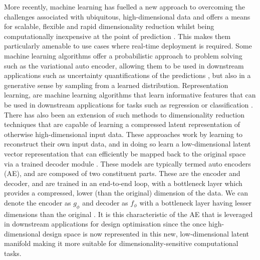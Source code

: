 \documentclass{article}
\begin{document}
More recently, machine learning has fuelled a new approach to overcoming the challenges associated with ubiquitous, high-dimensional data and offers a means for scalable, flexible and rapid dimensionality reduction whilst being computationally inexpensive at the point of prediction \citep{Deshpande2024}. This makes them particularly amenable to use cases where real-time deployment is required.  Some machine learning algorithms offer a probabilistic approach to problem solving such as the variational auto encoder, allowing them to be used in downstream applications such as uncertainty quantifications of the predictions \citep{Donnelly2024}, but also in a generative sense by sampling from a learned distribution. Representation learning,  are machine learning algorithms that learn informative features that can be used in downstream applications for tasks such as regression or classification \citep{Bengio2012}. There has also been an extension of such methods to dimensionality reduction techniques that are capable of learning a compressed latent representation of otherwise high-dimensional input data. These approaches work by learning to reconstruct their own input data, and in doing so learn a low-dimensional latent vector representation that can efficiently be mapped back to the original space via a trained decoder module \citep{Huang2022}. These models are typically termed auto encoders (AE), and are composed of two constituent parts. These are the encoder and decoder, and are trained in an end-to-end loop, with a bottleneck layer which provides a compressed, lower (than the original) dimension of the data. We can denote the encoder as  $g_\phi$ and decoder as $f_\phi$ with a bottleneck layer having lesser dimensions than the original \citep{DAgostino2018}. It is this characteristic of the AE that is leveraged in downstream applications for design optimisation since the once high-dimensional design space is now represented in this new, low-dimensional latent manifold making it more suitable for dimensionality-sensitive computational tasks.
\end{document}

